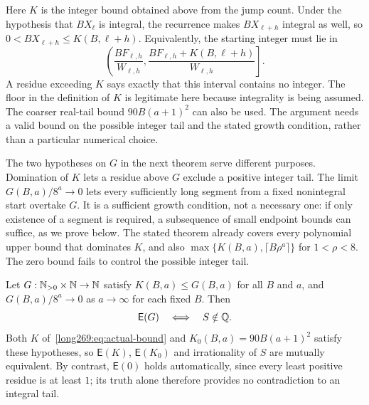 \documentclass[11pt]{article}
\theoremstyle{remark}
\theoremstyle{plain}
\newcommand{\Esc}{\mathsf E}
\begin{document}
Here $K$ is the integer bound obtained above from the jump count.
Under the hypothesis that $BX_\ell$ is integral, the recurrence makes
$BX_{\ell+h}$ integral as well, so $0<BX_{\ell+h}\le K(B,\ell+h)$.
Equivalently, the starting integer must lie in
\[
 \left(\frac{BF_{\ell,h}}{W_{\ell,h}},
       \frac{BF_{\ell,h}+K(B,\ell+h)}{W_{\ell,h}}\right].
\]
A residue exceeding $K$ says exactly that this interval contains no
integer. The floor in the definition of $K$ is legitimate here because
integrality is being assumed. The coarser real-tail bound $90B(a+1)^2$ can also be used. The argument needs a valid bound on the
possible integer tail and the stated growth condition, rather than a
particular numerical choice.

The two hypotheses on $G$ in the next theorem serve different purposes.
Domination of $K$ lets a residue above $G$ exclude a positive integer tail.
The limit $G(B,a)/8^a\to0$ lets every sufficiently long segment from a
fixed nonintegral start overtake $G$.  It is a sufficient growth condition,
not a necessary one: if only existence of a segment is required, a
subsequence of small endpoint bounds can suffice, as we prove below.
The stated theorem already covers every polynomial upper bound that
dominates $K$, and also $\max\{K(B,a),\lceil B\rho^a\rceil\}$ for
$1<\rho<8$.  The zero bound fails to control the possible integer tail.

\begin{theorem}\label{long269:res:actual-escape-endpoint}
\label{long269:res:lead-escape-equivalence}\label{long269:res:windowconsumer}
Let $G:\mathbb{N}_{>0}\times\mathbb{N}\to\mathbb{N}$ satisfy $K(B,a)\le G(B,a)$ for all $B$ and $a$,
and $G(B,a)/8^{a}\to0$ as $a\to\infty$ for each fixed $B$.  Then
\[
 \Esc(G)\quad\Longleftrightarrow\quad S\notin\Q .
\]
Both $K$ of~\eqref{long269:eq:actual-bound} and $K_0(B,a)=90B(a+1)^{2}$ satisfy these hypotheses, so $\Esc(K)$, $\Esc(K_0)$ and irrationality of $S$ are mutually
equivalent.  By contrast, $\Esc(0)$ holds automatically, since every
least positive residue is at least $1$; its truth alone therefore
provides no contradiction to an integral tail.
\end{theorem}
\end{document}
